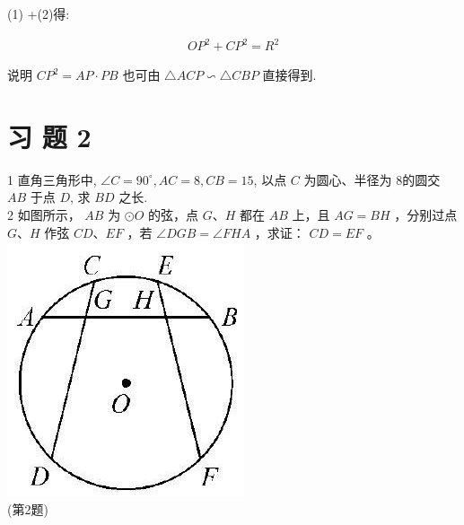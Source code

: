 \documentclass[10pt]{article}
\begin{document}
(1) +(2)得:

\begin{align*}
O P^{2}+C P^{2}=R^{2}
\end{align*}

说明 $C P^{2}=A P \cdot P B$ 也可由 $\triangle A C P \backsim \triangle C B P$ 直接得到.

\section*{习 题 2}
1 直角三角形中, $\angle C=90^{\circ}, A C=8, C B=15$, 以点 $C$ 为圆心、半径为 8的圆交 $A B$ 于点 $D$, 求 $B D$ 之长.\\
2 如图所示， $A B$ 为 $\odot O$ 的弦，点 $G 、 H$ 都在 $A B$ 上，且 $A G=B H$ ，分别过点 $G 、 H$ 作弦 $C D 、 E F$ ，若 $\angle D G B=\angle F H A$ ，求证： $C D=E F$ 。\\
\includegraphics[max width=\textwidth, center]{2024_10_30_66b8e5e701da2093c133g-020}\\
(第2题)\\
\end{document}
